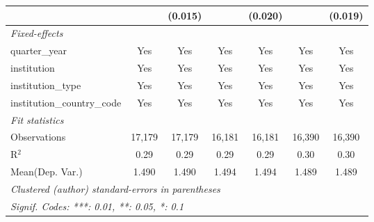 \begin{tabular}{lcccccc}
                                      &               & (0.015)       &              & (0.020)       &              & (0.019)\\   
   \midrule
   \emph{Fixed-effects}\\
   quarter\_year                      & Yes           & Yes           & Yes          & Yes           & Yes          & Yes\\  
   institution                        & Yes           & Yes           & Yes          & Yes           & Yes          & Yes\\  
   institution\_type                  & Yes           & Yes           & Yes          & Yes           & Yes          & Yes\\  
   institution\_country\_code         & Yes           & Yes           & Yes          & Yes           & Yes          & Yes\\  
   \midrule
   \emph{Fit statistics}\\
   Observations                       & 17,179        & 17,179        & 16,181       & 16,181        & 16,390       & 16,390\\  
   R$^2$                              & 0.29          & 0.29          & 0.29         & 0.29          & 0.30         & 0.30\\  
Mean(Dep. Var.) & 1.490 & 1.490 & 1.494 & 1.494 & 1.489 & 1.489 \\
   \midrule \midrule
   \multicolumn{7}{l}{\emph{Clustered (author) standard-errors in parentheses}}\\
   \multicolumn{7}{l}{\emph{Signif. Codes: ***: 0.01, **: 0.05, *: 0.1}}\\
\end{tabular}
\par\endgroup
